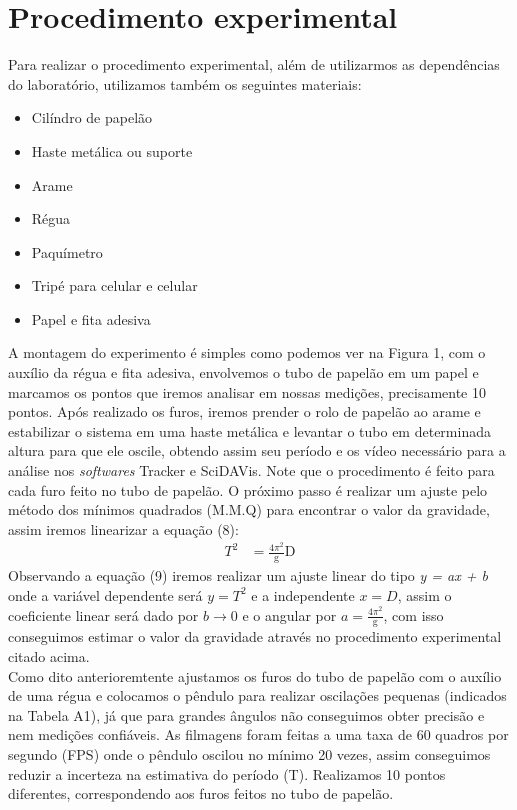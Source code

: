 \documentclass[a4paper]{report}
\begin{document}
\section*{Procedimento experimental}
\qquad Para realizar o procedimento experimental, além de utilizarmos as dependências do laboratório, utilizamos também os seguintes materiais:
 \begin{itemize}
   \item Cilíndro de papelão 
   \item Haste metálica ou suporte
   \item Arame
   \item Régua 
   \item Paquímetro 
   \item Tripé para celular e celular
   \item Papel e fita adesiva
 \end{itemize}
\qquad A montagem do experimento é simples como podemos ver na Figura 1, com o auxílio da régua e fita adesiva, envolvemos o tubo de papelão em um papel e marcamos os pontos que iremos analisar em nossas medições, precisamente 10 pontos. Após realizado os furos, iremos prender o rolo de papelão ao arame e estabilizar o sistema em uma haste metálica e levantar o tubo em determinada altura para que ele oscile, obtendo assim seu período e os vídeo necessário para a análise nos \textit{softwares} Tracker e SciDAVis. Note que o procedimento é feito para cada furo feito no tubo de papelão.
\qquad O próximo passo é realizar um ajuste pelo método dos mínimos quadrados (M.M.Q) para encontrar o valor da gravidade, assim iremos linearizar a equação (8):
\begin{align}
        T^{2} &= \frac{4\pi^{2}}{\text{g}}\text{D}   
\end{align}
\qquad Observando a equação (9) iremos realizar um ajuste linear do tipo \textit{y = ax + b} onde a variável dependente será $y = T^{2}$ e a independente $x = D$, assim o coeficiente linear será dado por $b \to 0$ e o angular por $a = \frac{4\pi^{2}}{\text{g}}$, com isso conseguimos estimar o valor da gravidade através no procedimento experimental citado acima.\\
\qquad Como dito anterioremtente ajustamos os furos do tubo de papelão com o auxílio de uma régua e colocamos o pêndulo para realizar oscilações pequenas (indicados na Tabela A1), já que para grandes ângulos não conseguimos obter precisão e nem medições confiáveis. As filmagens foram feitas a uma taxa de 60 quadros por segundo (FPS) onde o pêndulo oscilou no mínimo 20 vezes, assim conseguimos reduzir a incerteza na estimativa do período (T). Realizamos 10 pontos diferentes, correspondendo aos furos feitos no tubo de papelão.\\
\end{document}
